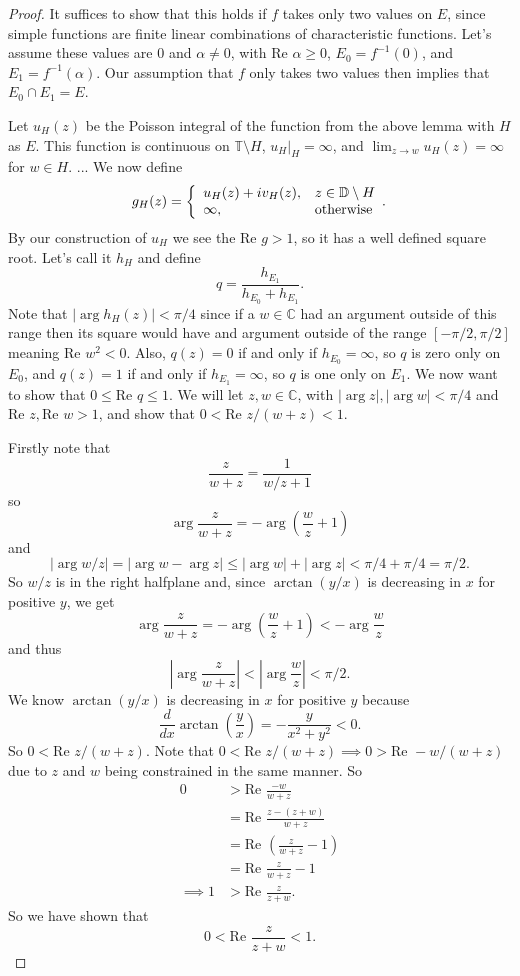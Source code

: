 \documentclass[a4paper,12pt,twoside,BCOR=10mm]{scrbook}
\renewcommand{\Re}{\text{Re }}
\begin{document}
\begin{proof}
It suffices to show that this holds if $f$ takes only two values on $E$, since simple functions are finite linear combinations of characteristic functions.
Let's assume these values are $0$ and $\alpha \neq 0$, with $\Re \alpha \geq 0$, $E_0 = f^{-1}(0)$, and $E_1 = f^{-1}(\alpha)$.
Our assumption that $f$ only takes two values then implies that $E_0 \cap E_1 = E$.

Let $u_H(z)$ be the Poisson integral of the function from the above lemma with $H$ as $E$. %
This function is continuous on $\mathbb{T} \setminus H$, $u_H|_H = \infty$, and $\lim_{z \rightarrow w} u_H(z) = \infty$ for $w \in H$.
...
We now define
\[
	g_H(z) =
	\left \{
		\begin{array}{l l}
		u_H(z) + iv_H(z), & z \in \mathbb{D} \setminus H\\
		\infty, & \text{otherwise}
		\end{array}.
	\right .
\]
By our construction of $u_H$ we see the $\Re g > 1$, so it has a well defined square root. %
Let's call it $h_H$ and define
\[
	q = \frac{h_{E_1}}{h_{E_0} + h_{E_1}}.
\]
Note that $|\arg h_H(z)| < \pi/4$ since if a $w \in \mathbb{C}$ had an argument outside of this range then its square would have and argument outside of the range $[-\pi/2, \pi/2]$ meaning $\Re w^2 < 0$.
Also, $q(z) = 0$ if and only if $h_{E_0} = \infty$, so $q$ is zero only on $E_0$, and $q(z) = 1$ if and only if $h_{E_1} = \infty$, so $q$ is one only on $E_1$.
We now want to show that $0 \leq \Re q \leq 1$.
We will let $z, w \in \mathbb{C}$, with $|\arg z|, |\arg w| < \pi/4$ and $\Re z, \Re w > 1$, and show that $0 < \Re z/(w + z) < 1$.

Firstly note that
\[
	\frac{z}{w + z}
	=
	\frac{1}{w/z + 1}
\]
so 
\[
	\arg \frac{z}{w + z} = -\arg \left ( \frac{w}{z} + 1 \right )
\]
and
\[
	|\arg w/z| = |\arg w - \arg z| \leq |\arg w| + |\arg z| < \pi/4 + \pi/4 = \pi/2.
\]
So $w/z$ is in the right halfplane and, since $\arctan(y/x)$ is decreasing in $x$ for positive $y$, we get
\[
	\arg \frac{z}{w + z} = -\arg \left ( \frac{w}{z} + 1 \right ) < -\arg  \frac{w}{z}
\]
and thus
\[
	\left |\arg \frac{z}{w + z} \right | < \left |\arg \frac{w}{z} \right | < \pi/2.
\]
We know $\arctan(y/x)$ is decreasing in $x$ for positive $y$ because
\[
	\frac{d}{dx}\arctan \left (\frac{y}{x} \right ) = -\frac{y}{x^2 + y^2} < 0.
\]
So $0 < \Re z/(w + z)$.
Note that $0 < \Re z/(w + z) \implies 0 > \Re -w/(w + z)$ due to $z$ and $w$ being constrained in the same manner.
So
\begin{align*}
	0
	&> \Re \frac{-w}{w + z}\\
	&= \Re \frac{z - (z + w)}{w + z}\\
	&= \Re \left ( \frac{z}{w + z} - 1 \right )\\
	&= \Re \frac{z}{w + z} - 1\\
	\implies 1 &> \Re \frac{z}{z + w}.
\end{align*}
So we have shown that
\[
	0 < \Re \frac{z}{z + w} < 1.
\]


\end{proof}
\end{document}
